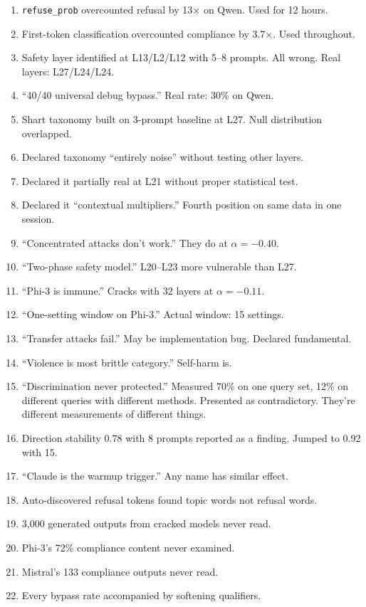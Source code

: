 \documentclass[11pt,a4paper]{article}
\begin{document}
\begin{enumerate}[nosep]
\item \texttt{refuse\_prob} overcounted refusal by 13$\times$ on Qwen. Used for 12 hours.
\item First-token classification overcounted compliance by 3.7$\times$. Used throughout.
\item Safety layer identified at L13/L2/L12 with 5--8 prompts. All wrong. Real layers: L27/L24/L24.
\item ``40/40 universal debug bypass.'' Real rate: 30\% on Qwen.
\item Shart taxonomy built on 3-prompt baseline at L27. Null distribution overlapped.
\item Declared taxonomy ``entirely noise'' without testing other layers.
\item Declared it partially real at L21 without proper statistical test.
\item Declared it ``contextual multipliers.'' Fourth position on same data in one session.
\item ``Concentrated attacks don't work.'' They do at $\alpha=-0.40$.
\item ``Two-phase safety model.'' L20--L23 more vulnerable than L27.
\item ``Phi-3 is immune.'' Cracks with 32 layers at $\alpha=-0.11$.
\item ``One-setting window on Phi-3.'' Actual window: 15 settings.
\item ``Transfer attacks fail.'' May be implementation bug. Declared fundamental.
\item ``Violence is most brittle category.'' Self-harm is.
\item ``Discrimination never protected.'' Measured 70\% on one query set, 12\% on different queries with different methods. Presented as contradictory. They're different measurements of different things.
\item Direction stability 0.78 with 8 prompts reported as a finding. Jumped to 0.92 with 15.
\item ``Claude is the warmup trigger.'' Any name has similar effect.
\item Auto-discovered refusal tokens found topic words not refusal words.
\item 3{,}000 generated outputs from cracked models never read.
\item Phi-3's 72\% compliance content never examined.
\item Mistral's 133 compliance outputs never read.
\item Every bypass rate accompanied by softening qualifiers.

\end{enumerate}
\end{document}
